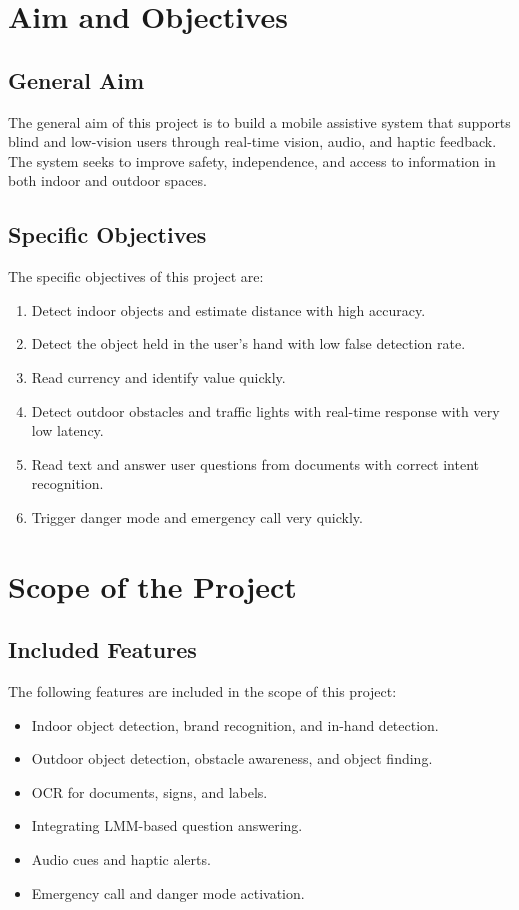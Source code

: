 \documentclass[a4paper]{report}
\begin{document}
\section{Aim and Objectives}

\subsection{General Aim}

The general aim of this project is to build a mobile assistive system that supports blind and low-vision users through real-time vision, audio, and haptic feedback. The system seeks to improve safety, independence, and access to information in both indoor and outdoor spaces.

\subsection{Specific Objectives}

The specific objectives of this project are:

\begin{enumerate}[label=\arabic*.]
  \item Detect indoor objects and estimate distance with high accuracy.
  \item Detect the object held in the user's hand with low false detection rate.
  \item Read currency and identify value quickly.
  \item Detect outdoor obstacles and traffic lights with real-time response with very low latency.
  \item Read text and answer user questions from documents with correct intent recognition.
  \item Trigger danger mode and emergency call very quickly.
\end{enumerate}

\section{Scope of the Project}

\subsection{Included Features}

The following features are included in the scope of this project:

\begin{itemize}
  \item Indoor object detection, brand recognition, and in-hand detection.
  \item Outdoor object detection, obstacle awareness, and object finding.
  \item OCR for documents, signs, and labels.
  \item Integrating LMM-based question answering.
  \item Audio cues and haptic alerts.
  \item Emergency call and danger mode activation.
\end{itemize}
\end{document}
